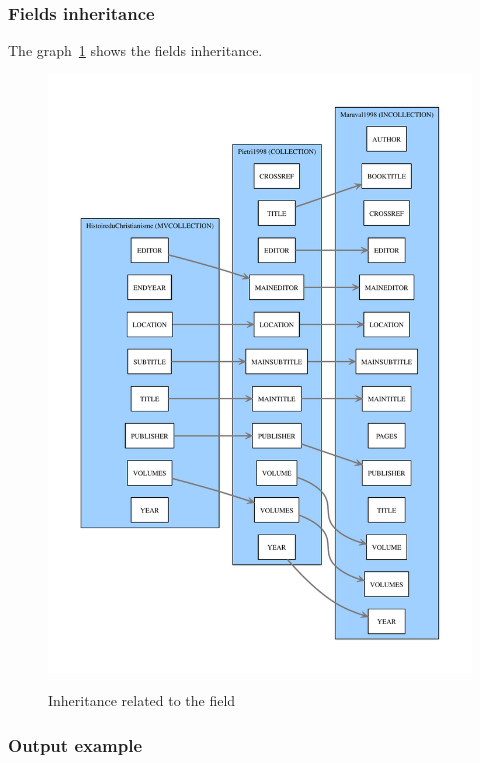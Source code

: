 \documentclass{ltxdockit}[2011/03/25]
\begin{document}
\inputminted[breaklines]{latex}{example-maineditor.bib}
\subsubsection{Fields inheritance}
The graph~\ref{example-maineditor} shows the fields inheritance.

\begin{figure}
  \centering
  \includegraphics[height=0.99\textheight]{example-maineditor.pdf}
  \label{example-maineditor}
  \caption{Inheritance related to the  field}
\end{figure}
\subsubsection{Output example}

\begin{quotation}
\cite{HistoireduChristianisme}

\cite{Pietri1998}

\cite{Maraval1998}
\end{quotation}
\end{document}
